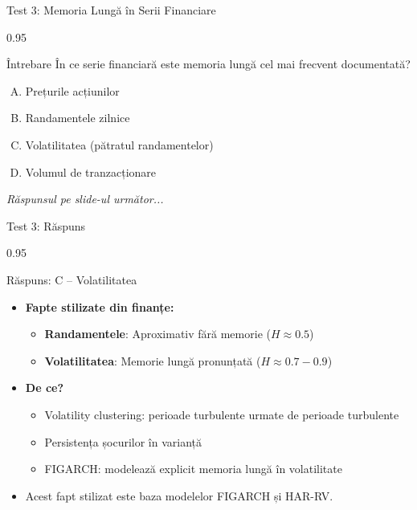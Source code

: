 \documentclass[9pt, aspectratio=169, t]{beamer}
\begin{document}
\begin{frame}{Test 3: Memoria Lungă în Serii Financiare}
    \begin{cminipage}{0.95\textwidth}
    \begin{alertblock}{Întrebare}
        În ce serie financiară este memoria lungă cel mai frecvent documentată?
    \end{alertblock}

    \vspace{0.3cm}

    \begin{enumerate}[A)]\setlength{\itemsep}{0pt}
        \item Prețurile acțiunilor
        \item Randamentele zilnice
        \item Volatilitatea (pătratul randamentelor)
        \item Volumul de tranzacționare
    \end{enumerate}

    \vspace{0.5cm}
    \begin{flushright}\textit{Răspunsul pe slide-ul următor...}\end{flushright}
    \end{cminipage}
\end{frame}

\begin{frame}{Test 3: Răspuns}
    \begin{cminipage}{0.95\textwidth}
    \begin{exampleblock}{Răspuns: C -- Volatilitatea}
        \begin{itemize}\setlength{\itemsep}{0pt}
            \item \textbf{Fapte stilizate din finanțe:}
            \begin{itemize}\setlength{\itemsep}{0pt}
                \item \textbf{Randamentele}: Aproximativ fără memorie ($H \approx 0.5$)
                \item \textbf{Volatilitatea}: Memorie lungă pronunțată ($H \approx 0.7-0.9$)
            \end{itemize}
            \item \textbf{De ce?}
            \begin{itemize}\setlength{\itemsep}{0pt}
                \item Volatility clustering: perioade turbulente urmate de perioade turbulente
                \item Persistența șocurilor în varianță
                \item FIGARCH: modelează explicit memoria lungă în volatilitate
            \end{itemize}
            \item {\footnotesize Acest fapt stilizat este baza modelelor FIGARCH și HAR-RV.}
        \end{itemize}
    \end{exampleblock}
    \end{cminipage}
\end{frame}
\end{document}
